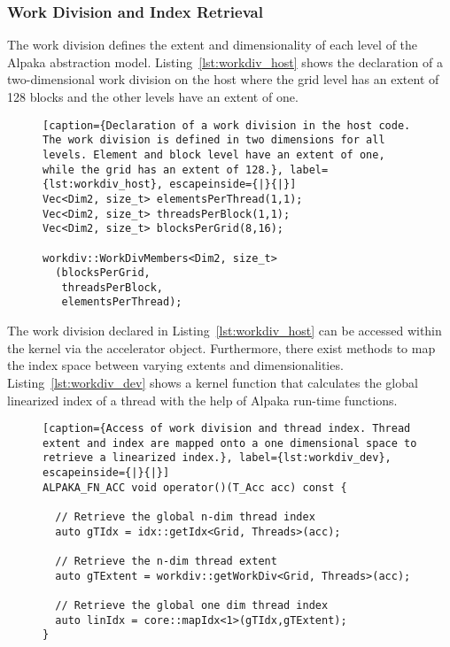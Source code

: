 \documentclass[10pt, twocolumn]{article}
\newcommand{\alpaka}{Alpaka\xspace}
\begin{document}
\subsubsection{Work Division and Index Retrieval}
The work division defines the extent and dimensionality of each level of the \alpaka abstraction model.
Listing~\ref{lst:workdiv_host} shows the declaration of a two-dimensional work division on the host where the grid level has an extent of 128 blocks and the other levels have an extent of one.

\begin{figure}
\begin{minipage}{\linewidth}
\hfill
\begin{lstlisting}[caption={Declaration of a work division in the host code. The work division is defined in two dimensions for all levels. Element and block level have an extent of one, while the grid has an extent of 128.}, label={lst:workdiv_host}, escapeinside={|}{|}]
Vec<Dim2, size_t> elementsPerThread(1,1);
Vec<Dim2, size_t> threadsPerBlock(1,1);
Vec<Dim2, size_t> blocksPerGrid(8,16);

workdiv::WorkDivMembers<Dim2, size_t>
  (blocksPerGrid,
   threadsPerBlock,
   elementsPerThread);
\end{lstlisting}
\hfill
\end{minipage}
      \vspace{-1.5em}
\end{figure}

\noindent The work division declared in Listing~\ref{lst:workdiv_host} can be accessed within the kernel via the accelerator object.
Furthermore, there exist methods to map the index space between varying extents and dimensionalities.
Listing~\ref{lst:workdiv_dev} shows a kernel function that calculates the global linearized index of a thread with the help of \alpaka run-time functions.
\begin{figure}
\begin{minipage}{\linewidth}
\hfill
  \begin{lstlisting}[caption={Access of work division and thread index. Thread extent and index are mapped onto a one dimensional space to retrieve a linearized index.}, label={lst:workdiv_dev}, escapeinside={|}{|}]
ALPAKA_FN_ACC void operator()(T_Acc acc) const {

  // Retrieve the global n-dim thread index
  auto gTIdx = idx::getIdx<Grid, Threads>(acc);

  // Retrieve the n-dim thread extent
  auto gTExtent = workdiv::getWorkDiv<Grid, Threads>(acc);

  // Retrieve the global one dim thread index
  auto linIdx = core::mapIdx<1>(gTIdx,gTExtent);
}
  \end{lstlisting}
\hfill
\end{minipage}
      \vspace{-1.5em}
\end{figure}
\end{document}
